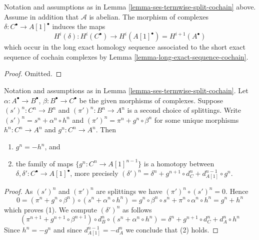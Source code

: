 \begin{lemma}
\label{lemma-ses-termwise-split-long-cochain}
Notation and assumptions as in
Lemma \ref{lemma-ses-termwise-split-cochain} above.
Assume in addition that $\mathcal{A}$ is abelian.
The morphism of complexes $\delta : C^\bullet \to A[1]^\bullet$
induces the maps
$$
H^i(\delta) :
H^i(C^\bullet) \longrightarrow H^i(A[1]^\bullet) = H^{i + 1}(A^\bullet)
$$
which occur in the long exact homology sequence associated
to the short exact sequence of cochain complexes by
Lemma \ref{lemma-long-exact-sequence-cochain}.
\end{lemma}

\begin{proof}
Omitted.
\end{proof}

\begin{lemma}
\label{lemma-ses-termwise-split-homotopy-cochain}
Notation and assumptions as in
Lemma \ref{lemma-ses-termwise-split-cochain}.
Let $\alpha : A^\bullet \to B^\bullet$,
$\beta : B^\bullet \to C^\bullet$ be the given
morphisms of complexes.
Suppose $(s')^n : C^n \to B^n$ and $(\pi')^n : B^n \to A^n$
is a second choice of splittings.
Write $(s')^n = s^n + \alpha^n \circ h^n$ and
$(\pi')^n = \pi^n + g^n \circ \beta^n$ for some unique
morphisms $h^n : C^n \to A^n$ and $g^n : C^n \to A^n$. Then
\begin{enumerate}
\item $g^n = - h^n$, and
\item the family of maps $\{g^n : C^n \to A[1]^{n - 1}\}$ is a homotopy
between $\delta, \delta' : C^\bullet \to A[1]^\bullet$, more precisely
$(\delta')^n = \delta^n + g^{n + 1} \circ d_C^n + d_{A[1]}^{n - 1} \circ g^n$.
\end{enumerate}
\end{lemma}

\begin{proof}
As $(s')^n$ and $(\pi')^n$ are splittings we have $(\pi')^n \circ (s')^n = 0$.
Hence
$$
0 = ( \pi^n + g^n \circ \beta^n ) \circ ( s^n + \alpha^n \circ h^n ) =
g^n \circ \beta^n \circ s^n + \pi^n \circ \alpha^n \circ h^n =
g^n + h^n
$$
which proves (1). We compute $(\delta')^n$ as follows
$$
( \pi^{n + 1} + g^{n + 1} \circ \beta^{n + 1} )
\circ d_B^n \circ
( s^n + \alpha^n \circ h^n )
= \delta^n + g^{n + 1} \circ d_C^n + d_A^n \circ h^n
$$
Since $h^n = -g^n$ and since $d_{A[1]}^{n - 1} = -d_A^n$ we conclude that (2)
holds.
\end{proof}




